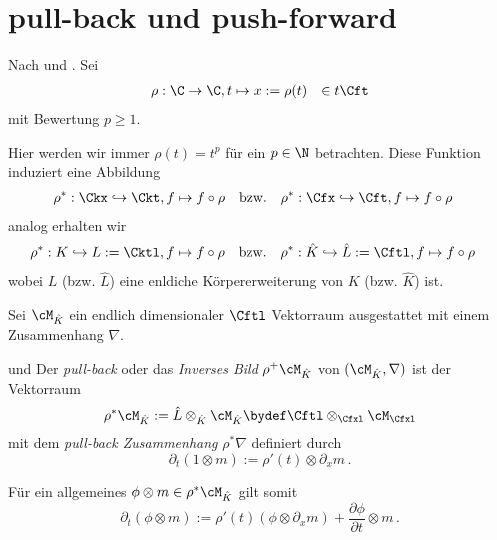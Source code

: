 \section{pull-back und push-forward}
\begin{comment}
TODO: Variable zu x machen
\end{comment}
Nach \cite[1.a]{sabbah_Fourier-local} und \cite[1.3]{hotta2007d}.
%
Sei
\begin{align*}
\rho&:\C\rightarrow \C , t\mapsto x:=\rho(t) &\in t\Cft
\end{align*}
mit Bewertung $p\geq1$.
\begin{comment}
TODO: muss das ein Homomorphismus sein? \cite[Seite 130]{coutinho1995primer}
\end{comment}
Hier werden wir immer $\rho(t)=t^p$ für ein $p\in \N$
betrachten. Diese Funktion induziert eine Abbildung
\begin{align*}
\rho^*&:\Ckx\hookrightarrow \Ckt, f \mapsto f\circ \rho & \mbox{bzw.} &&
\rho^*&:\Cfx\hookrightarrow \Cft, f \mapsto f\circ \rho
\end{align*}
analog erhalten wir
\begin{align*}
\rho^*&:K\hookrightarrow L:=\Cktl, f \mapsto f\circ \rho & \mbox{bzw.} &&
\rho^*&:\hat K\hookrightarrow \hat L:=\Cftl, f \mapsto f\circ \rho
\end{align*}
wobei $L$ (bzw. $\hat L$) eine enldiche Körpererweiterung von $K$ (bzw. $\hat
K$) ist.
\begin{comment}
TODO: damit wird $\hat L$ zu einem $\hat K$ Vektorraum.
\end{comment}
Sei $\cM_{\hat K}$ ein endlich dimensionaler $\Cftl$ Vektorraum ausgestattet mit
einem Zusammenhang $\nabla$.
%
\begin{defn} \label{defn:pull-back}
\cite[1.a]{sabbah_Fourier-local} und
\cite[Page 34]{sabbah_cimpa90}
Der \emph{pull-back} oder das \emph{Inverses Bild} $\rho^{+}\cM_{\hat K}$ von
$(\cM_{\hat K},\nabla)$ ist der Vektorraum
\[
\rho^{*}\cM_{\hat K}:=\hat L\otimes_{\hat K}\cM_{\hat K}
\bydef\Cftl\otimes_{\Cfxl}\cM_{\Cfxl}
\]
 mit dem \emph{pull-back Zusammenhang} $\rho^*\nabla$ definiert durch
\begin{equation} \label{eq:pull-back-zusammenhang}
\partial_t(1\otimes m):=\rho'(t)\otimes\partial_xm \,.
\end{equation}
\end{defn}
Für ein allgemeines $\phi\otimes m\in \rho^{*}\cM_{\hat K}$ gilt somit
\begin{equation} \label{eq:pull-back-zusammenhang-2}
\partial_t(\phi\otimes m):=\rho'(t)(\phi\otimes\partial_xm) +
  \frac{\partial\phi}{\partial t}\otimes m \,.
\end{equation}

